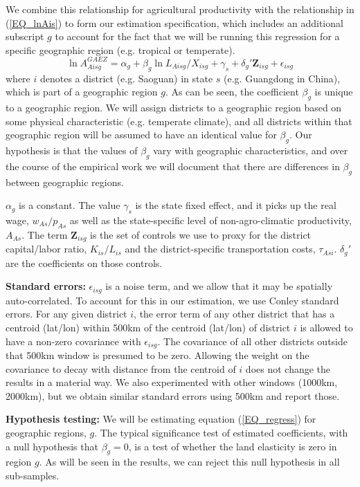 \documentclass[12pt]{article}
\begin{document}
We combine this relationship for agricultural productivity with the relationship in (\ref{EQ_lnAis}) to form our estimation specification, which includes an additional subscript $g$ to account for the fact that we will be running this regression for a specific geographic region (e.g. tropical or temperate).
\begin{equation}
\ln A^{GAEZ}_{Aisg} = \alpha_g + \beta_g \ln L_{Aisg}/X_{isg} + \gamma_{s} + \delta_g' \mathbf{Z}_{isg} + \epsilon_{isg} \label{EQ_regress}
\end{equation}
where $i$ denotes a district (e.g. Saoguan) in state $s$ (e.g. Guangdong in China), which is part of a geographic region $g$. As can be seen, the coefficient $\beta_g$ is unique to a geographic region. We will assign districts to a geographic region based on some physical characteristic (e.g. temperate climate), and all districts within that geographic region will be assumed to have an identical value for $\beta_g$. Our hypothesis is that the values of $\beta_g$ vary with geographic characteristics, and over the course of the empirical work we will document that there are differences in $\beta_g$ between geographic regions.

$\alpha_g$ is a constant. The value $\gamma_s$ is the state fixed effect, and it picks up the real wage, $w_{As}/p_{As}$ as well as the state-specific level of non-agro-climatic productivity, $A_{As}$. The term $\mathbf{Z}_{isg}$ is the set of controls we use to proxy for the district capital/labor ratio, $K_{is}/L_{is}$ and the district-specific transportation costs, $\tau_{Asi}$. $\delta_g'$ are the coefficients on those controls.

\vspace{.5cm}\noindent\textbf{Standard errors:} $\epsilon_{isg}$ is a noise term, and we allow that it may be spatially auto-correlated. To account for this in our estimation, we use Conley standard errors. For any given district $i$, the error term of any other district that has a centroid (lat/lon) within 500km of the centroid (lat/lon) of district $i$ is allowed to have a non-zero covariance with $\epsilon_{isg}$. The covariance of all other districts outside that 500km window is presumed to be zero. Allowing the weight on the covariance to decay with distance from the centroid of $i$ does not change the results in a material way. We also experimented with other windows (1000km, 2000km), but we obtain similar standard errors using 500km and report those.

\vspace{.5cm}\noindent\textbf{Hypothesis testing:} We will be estimating equation (\ref{EQ_regress}) for geographic regions, $g$. The typical significance test of estimated coefficients, with a null hypothesis that $\beta_g=0$, is a test of whether the land elasticity is zero in region $g$. As will be seen in the results, we can reject this null hypothesis in all sub-samples.
\end{document}
